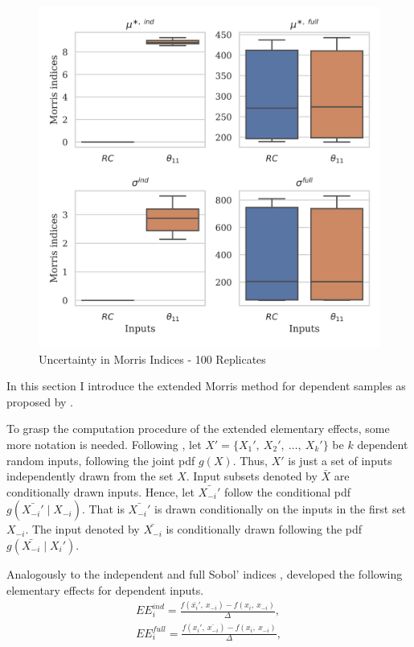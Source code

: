 \begin{figure}[t]
	\caption{Uncertainty in Morris Indices - 100 Replicates}
    \label{morris_replicates}
	\vspace*{-4mm}
	\centering
	\includegraphics[scale=0.9]{../figures/boxplot_morris_replicates_100.png}
\end{figure}

In this section I introduce the extended Morris method for dependent samples as proposed by \citet{GM17}.

To grasp the computation procedure of the extended elementary effects, some more notation is needed. Following \citet{GM17}, let $X' = \{X_1',\ X_2',\ \dots,\ X_k'\}$ be $k$ dependent random inputs, following the joint pdf $g(X)$. Thus, $X'$ is just a set of inputs independently drawn from the set $X$. Input subsets denoted by $\bar{X}$ are conditionally drawn inputs. Hence, let $\bar{X_{-i}'}$ follow the conditional pdf $g(\bar{X_{-i}'} \mid X_{-i})$. That is $\bar{X_{-i}'}$ is drawn conditionally on the inputs in the first set $X_{-i}$. The input denoted by $\bar{X_{-i}}$ is conditionally drawn following the pdf $g(\bar{X_{-i}} \mid X_i')$. %

Analogously to the independent and full Sobol' indices \citep{MTA15}, \citet{GM17} developed the following elementary effects for dependent inputs.
\begin{align}
EE_i^{ind} = \frac{f(\bar{x_i}',\ x_{-i}) - f(x_i,\ x_{-i})}{\Delta},\\
EE_i^{full} = \frac{f(x_i',\ \bar{x_{-i}}) - f(x_i,\ x_{-i})}{\Delta},
\end{align}

